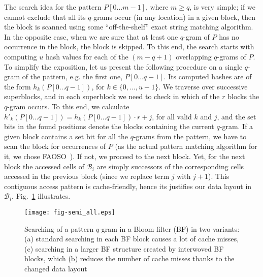 \documentclass{llncs}
\begin{document}
The search idea for the pattern $P[0 \ldots m-1]$, where $m \geq q$, 
is very simple;
if we cannot exclude that all its $q$-grams occur (in any location) 
in a given block, then the block is scanned using some ``off-the-shelf'' 
exact string matching algorithm.
In the opposite case, when we are sure that at least one $q$-gram of $P$ 
has no occurrence in the block, the block is skipped.
To this end, the search starts with computing $u$ hash values
for each of the $(m-q+1)$ overlapping $q$-grams of $P$.
To simplify the exposition, let us present the following procedure 
on a single $q$-gram of the pattern, e.g. the first one, $P[0 \ldots q-1]$.
Its computed hashes are of the form $h_k(P[0 \ldots q-1])$, for 
$k \in \{0, \ldots, u-1\}$.
We traverse over successive superblocks, and in each superblock
we need to check in which of the $r$ blocks the $q$-gram occurs.
To this end, we calculate $h'_k(P[0 \ldots q-1]) = h_k(P[0 \ldots q-1]) \cdot r + j$, 
for all valid $k$ and $j$, and the set bits in the found positions denote 
the blocks containing the current $q$-gram.
If a given block contains a set bit for all the $q$-grams from the pattern, 
we have to scan the block for occurrences of $P$ 
(as the actual pattern matching algorithm for it, we chose FAOSO~\cite{FGjda09}).
If not, we proceed to the next block.
Yet, for the next block the accessed cells of $\mathcal{B}_i$ are simply 
successors of the corresponding cells accessed in the previous block 
(since we replace term $j$ with $j+1$).
This contiguous access pattern is cache-friendly, hence its justifies our 
data layout in $\mathcal{B}_i$.
Fig.~\ref{fig:semi_all} illustrates.

 
\begin{figure}
\centerline{
\texttt{[image: fig-semi\_all.eps]}
}
\caption[Illustration]
{Searching of a pattern $q$-gram in a Bloom filter (BF) in two variants: 
(a) standard searching in each BF block causes a lot of cache misses, 
(c) searching in a larger BF structure created by interwoved BF blocks, 
which (b) reduces the number of cache misses thanks to the changed data layout}
\label{fig:semi_all}
\end{figure}
\end{document}

